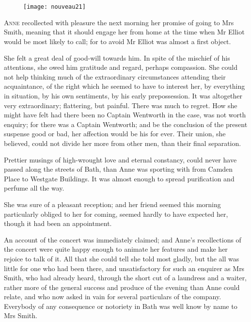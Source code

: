 \chapter[Chapter \thechapter]{}

\begin{figure}[t!]
\centering
\texttt{[image: nouveau21]}
\end{figure}

\lettrine[lraise=0.3]{A}{nne} recollected with pleasure the next morning her promise of going to Mrs Smith, meaning that it should engage her from home at the time when Mr Elliot would be most likely to call; for to avoid Mr Elliot was almost a first object.

She felt a great deal of good-will towards him. In spite of the mischief of his attentions, she owed him gratitude and regard, perhaps compassion. She could not help thinking much of the extraordinary circumstances attending their acquaintance, of the right which he seemed to have to interest her, by everything in situation, by his own sentiments, by his early prepossession. It was altogether very extraordinary; flattering, but painful. There was much to regret. How she might have felt had there been no Captain Wentworth in the case, was not worth enquiry; for there was a Captain Wentworth; and be the conclusion of the present suspense good or bad, her affection would be his for ever. Their union, she believed, could not divide her more from other men, than their final separation.

Prettier musings of high-wrought love and eternal constancy, could never have passed along the streets of Bath, than Anne was sporting with from Camden Place to Westgate Buildings. It was almost enough to spread purification and perfume all the way.

She was sure of a pleasant reception; and her friend seemed this morning particularly obliged to her for coming, seemed hardly to have expected her, though it had been an appointment.

An account of the concert was immediately claimed; and Anne's recollections of the concert were quite happy enough to animate her features and make her rejoice to talk of it. All that she could tell she told most gladly, but the all was little for one who had been there, and unsatisfactory for such an enquirer as Mrs Smith, who had already heard, through the short cut of a laundress and a waiter, rather more of the general success and produce of the evening than Anne could relate, and who now asked in vain for several particulars of the company. Everybody of any consequence or notoriety in Bath was well know by name to Mrs Smith.

